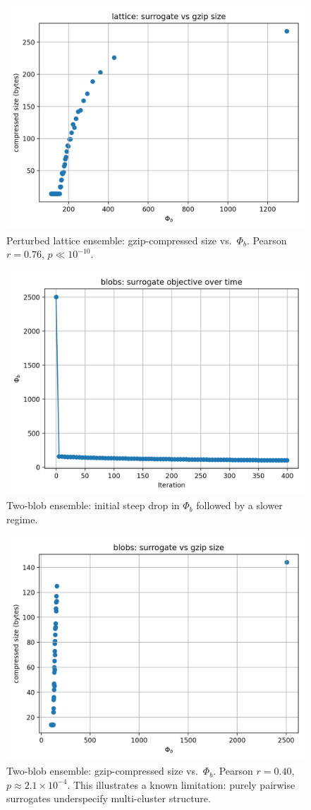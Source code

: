 \documentclass[11pt]{article}
\begin{document}
\begin{figure}[h!]
  \centering
  \includegraphics[width=0.7\linewidth]{figures/lattice_phib_vs_compressed.png}
  \caption{Perturbed lattice ensemble: gzip-compressed size vs.\ $\Phi_b$. Pearson $r{=}0.76$, $p{\ll}10^{-10}$.}
  \label{fig:lattice_corr}
\end{figure}

\begin{figure}[h!]
  \centering
  \includegraphics[width=0.7\linewidth]{figures/blobs_phib_vs_iter.png}
  \caption{Two-blob ensemble: initial steep drop in $\Phi_b$ followed by a slower regime.}
  \label{fig:blobs_iter}
\end{figure}

\begin{figure}[h!]
  \centering
  \includegraphics[width=0.7\linewidth]{figures/blobs_phib_vs_compressed.png}
  \caption{Two-blob ensemble: gzip-compressed size vs.\ $\Phi_b$. Pearson $r{=}0.40$, $p{\approx}2.1{\times}10^{-4}$. 
  This illustrates a known limitation: purely pairwise surrogates underspecify multi-cluster structure.}
  \label{fig:blobs_corr}
\end{figure}
\end{document}
